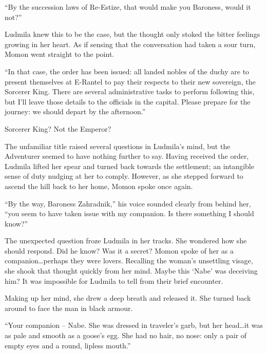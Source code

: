  

“By the succession laws of Re-Estize, that would make you Baroness, would it not?”

 

Ludmila knew this to be the case, but the thought only stoked the bitter feelings growing in her heart. As if sensing that the conversation had taken a sour turn, Momon went straight to the point.

 

“In that case, the order has been issued: all landed nobles of the duchy are to present themselves at E-Rantel to pay their respects to their new sovereign, the Sorcerer King. There are several administrative tasks to perform following this, but I’ll leave those details to the officials in the capital. Please prepare for the journey: we should depart by the afternoon.”

 

Sorcerer King? Not the Emperor?

 

The unfamiliar title raised several questions in Ludmila’s mind, but the Adventurer seemed to have nothing further to say. Having received the order, Ludmila lifted her spear and turned back towards the settlement; an intangible sense of duty nudging at her to comply. However, as she stepped forward to ascend the hill back to her home, Momon spoke once again.

 

“By the way, Baroness Zahradnik,” his voice sounded clearly from behind her, “you seem to have taken issue with my companion. Is there something I should know?”

 

The unexpected question froze Ludmila in her tracks. She wondered how she should respond. Did he know? Was it a secret? Momon spoke of her as a companion…perhaps they were lovers. Recalling the woman’s unsettling visage, she shook that thought quickly from her mind. Maybe this ‘Nabe’ was deceiving him? It was impossible for Ludmila to tell from their brief encounter.

 

Making up her mind, she drew a deep breath and released it. She turned back around to face the man in black armour.

 

“Your companion – Nabe. She was dressed in traveler’s garb, but her head…it was as pale and smooth as a goose’s egg. She had no hair, no nose: only a pair of empty eyes and a round, lipless mouth.”

